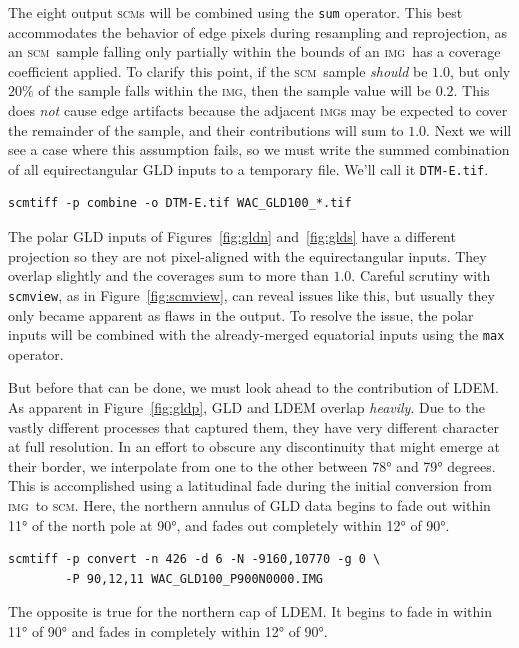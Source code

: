\documentclass[oneside,10pt]{memoir}
\newcommand{\scm}     {\textsc{scm}}
\newcommand{\img}     {\textsc{img}}
\newcommand{\scmview} {\texttt{scmview}}
\begin{document}
\begin{Spacing}{1.1}
The eight output \scm s will be combined using the \texttt{sum} operator. This best accommodates the behavior of edge pixels during resampling and reprojection, as an \scm\ sample falling only partially within the bounds of an \img\ has a coverage coefficient applied. To clarify this point, if the \scm\ sample \emph{should} be $1.0$, but only $20\%$ of the sample falls within the \img, then the sample value will be $0.2$. This does \emph{not} cause edge artifacts because the adjacent \img s may be expected to cover the remainder of the sample, and their contributions will sum to $1.0$. Next we will see a case where this assumption fails, so we must write the summed combination of all equirectangular GLD inputs to a temporary file. We'll call it \texttt{DTM-E.tif}.

\begin{Verbatim}
scmtiff -p combine -o DTM-E.tif WAC_GLD100_*.tif
\end{Verbatim}

The polar GLD inputs of Figures~\ref{fig:gldn} and~\ref{fig:glds} have a different projection so they are not pixel-aligned with the equirectangular inputs. They overlap slightly and the coverages sum to more than $1.0$. Careful scrutiny with \scmview, as in Figure~\ref{fig:scmview}, can reveal issues like this, but usually they only became apparent as flaws in the output. To resolve the issue, the polar inputs will be combined with the already-merged equatorial inputs using the \texttt{max} operator.

But before that can be done, we must look ahead to the contribution of LDEM. As apparent in Figure~\ref{fig:gldp}, GLD and LDEM overlap \emph{heavily}. Due to the vastly different processes that captured them, they have very different character at full resolution. In an effort to obscure any discontinuity that might emerge at their border, we interpolate from one to the other between \ang{78} and \ang{79} degrees. This is accomplished using a latitudinal fade during the initial conversion from \img\ to \scm. Here, the northern annulus of GLD data begins to fade out within \ang{11} of the north pole at \ang{90}, and fades out completely within \ang{12} of \ang{90}.

\begin{Verbatim}
scmtiff -p convert -n 426 -d 6 -N -9160,10770 -g 0 \
        -P 90,12,11 WAC_GLD100_P900N0000.IMG
\end{Verbatim}

The opposite is true for the northern cap of LDEM. It begins to fade in within \ang{11} of \ang{90} and fades in completely within \ang{12} of \ang{90}.


\end{Spacing}
\end{document}
